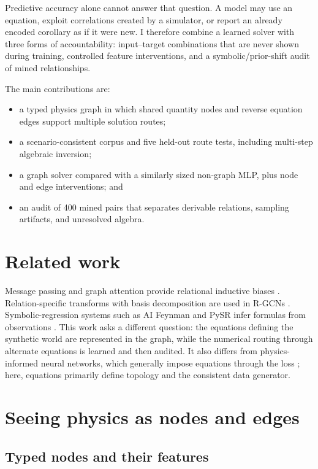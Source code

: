 \documentclass[10pt]{article}
\begin{document}
Predictive accuracy alone cannot answer that question. A model may use an equation, exploit correlations created by a simulator, or report an already encoded corollary as if it were new. I therefore combine a learned solver with three forms of accountability: input--target combinations that are never shown during training, controlled feature interventions, and a symbolic/prior-shift audit of mined relationships.

The main contributions are:
\begin{itemize}
 \item a typed physics graph in which shared quantity nodes and reverse equation edges support multiple solution routes;
 \item a scenario-consistent corpus and five held-out route tests, including multi-step algebraic inversion;
 \item a graph solver compared with a similarly sized non-graph MLP, plus node and edge interventions; and
 \item an audit of 400 mined pairs that separates derivable relations, sampling artifacts, and unresolved algebra.
\end{itemize}

\section{Related work}

Message passing and graph attention provide relational inductive biases \cite{gilmer2017,kipf2017,velickovic2018,battaglia2018}. Relation-specific transforms with basis decomposition are used in R-GCNs \cite{schlichtkrull2018}. Symbolic-regression systems such as AI Feynman and PySR infer formulas from observations \cite{udrescu2020,cranmer2023}. This work asks a different question: the equations defining the synthetic world are represented in the graph, while the numerical routing through alternate equations is learned and then audited. It also differs from physics-informed neural networks, which generally impose equations through the loss \cite{raissi2019}; here, equations primarily define topology and the consistent data generator.

\section{Seeing physics as nodes and edges}

\subsection{Typed nodes and their features}
\end{document}
